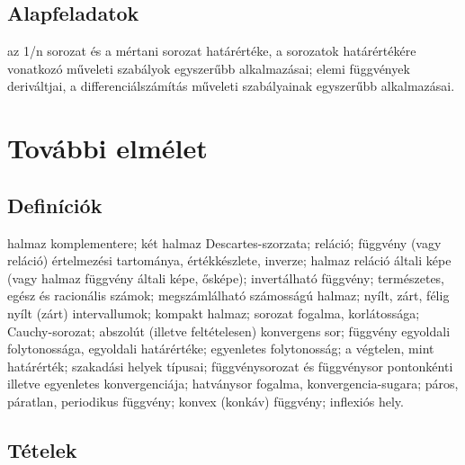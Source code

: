 \documentclass{article}
\begin{document}
\subsection{Alapfeladatok}

az 1/n sorozat és a mértani sorozat határértéke, a sorozatok határértékére
vonatkozó műveleti szabályok egyszerűbb alkalmazásai; elemi függvények deriváltjai,
a differenciálszámítás műveleti szabályainak egyszerűbb alkalmazásai. 


\section{További elmélet}

\subsection{Definíciók}
 
halmaz komplementere; két halmaz Descartes-szorzata; reláció; függvény
(vagy reláció) értelmezési tartománya, értékkészlete, inverze; halmaz reláció általi képe
(vagy halmaz függvény általi képe, ősképe); invertálható függvény; természetes, egész
és racionális számok; megszámlálható számosságú halmaz; nyílt, zárt, félig nyílt (zárt)
intervallumok; kompakt halmaz; sorozat fogalma, korlátossága; Cauchy-sorozat;
abszolút (illetve feltételesen) konvergens sor; függvény egyoldali folytonossága,
egyoldali határértéke; egyenletes folytonosság; a végtelen, mint határérték; szakadási
helyek típusai; függvénysorozat és függvénysor pontonkénti illetve egyenletes
konvergenciája; hatványsor fogalma, konvergencia-sugara; páros, páratlan, periodikus
függvény; konvex (konkáv) függvény; inflexiós hely.

\subsection{Tételek}
\end{document}
